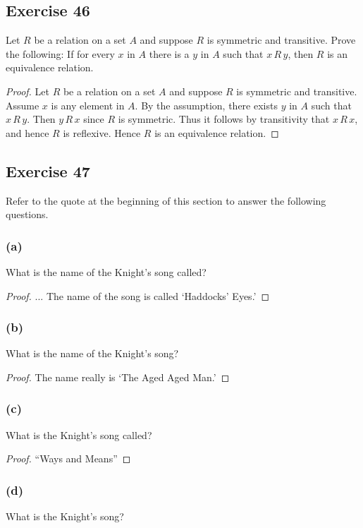 \documentclass[14pt]{extarticle}
\begin{document}
\subsection{Exercise 46}
Let $R$ be a relation on a set $A$ and suppose $R$ is symmetric and transitive. Prove the following: If for every 
$x$ in $A$ there is a $y$ in $A$ such that \(x \,R\, y\), then $R$ is an equivalence relation.

\begin{proof}
Let $R$ be a relation on a set $A$ and suppose $R$ is symmetric and transitive. Assume $x$ is any element in $A$. 
By the assumption, there exists $y$ in $A$ such that \(x \,R\, y\). Then \(y \,R\, x\) since $R$ is symmetric. Thus 
it follows by transitivity that \(x \,R\, x\), and hence $R$ is reflexive. Hence $R$ is an equivalence relation.
\end{proof}

\subsection{Exercise 47}
Refer to the quote at the beginning of this section to answer the following questions.

\subsubsection{(a)}
What is the name of the Knight’s song called?

\begin{proof}
... The name of the song is called ‘Haddocks’ Eyes.’
\end{proof}

\subsubsection{(b)}
What is the name of the Knight’s song?

\begin{proof}
The name really is ‘The Aged Aged Man.’
\end{proof}

\subsubsection{(c)}
What is the Knight’s song called?

\begin{proof}
“Ways and Means”
\end{proof}

\subsubsection{(d)}
What is the Knight’s song?
\end{document}
